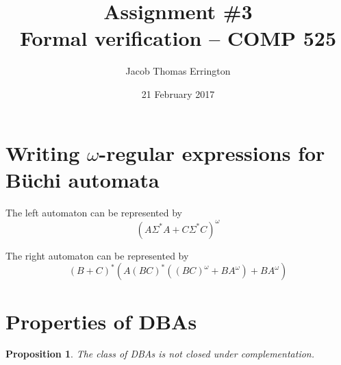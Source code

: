 \documentclass[letterpaper,11pt]{article}
\author{Jacob Thomas Errington}
\date{21 February 2017}
\title{Assignment \#3\\Formal verification -- COMP 525}
\newtheorem{prop}{Proposition}
\newcommand{\question}{\section}
\begin{document}
\maketitle

\question{Writing $\omega$-regular expressions for B\"uchi automata}

The left automaton can be represented by
\begin{equation*}
    (A \Sigma^* A + C \Sigma^* C)^\omega
\end{equation*}

The right automaton can be represented by
\begin{equation*}
    (B + C)^* (A (BC)^* ( (BC)^\omega + BA^\omega ) + B A^\omega )
\end{equation*}

\question{Properties of DBAs}

\begin{prop}
    The class of DBAs is not closed under complementation.
\end{prop}
\end{document}
